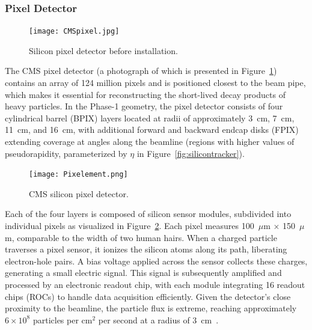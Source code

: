 \subsubsection{Pixel Detector}

\begin{figure}[!ht]
    \begin{center}
        \texttt{[image: CMSpixel.jpg]}
        \caption{Silicon pixel detector before installation.}
        \label{fig:CMSpixel}
    \end{center}
\end{figure}

The CMS pixel detector (a photograph of which is presented in Figure~\ref{fig:CMSpixel}) contains an array of 124 million pixels and is positioned closest to the beam pipe, which makes it essential for reconstructing the short-lived decay products of heavy particles. In the Phase-1 geometry, the pixel detector consists of four cylindrical barrel (BPIX) layers located at radii of approximately 3~cm, 7~cm, 11~cm, and 16~cm, with additional forward and backward endcap disks (FPIX) extending coverage at angles along the beamline (regions with higher values of pseudorapidity, parameterized by $\eta$ in Figure~\ref{fig:silicontracker}).

\begin{figure}[!ht]
    \begin{center}
        \texttt{[image: Pixelement.png]}
        \caption{CMS silicon pixel detector.}
        \label{fig:Pixelement}
    \end{center}
\end{figure}

Each of the four layers is composed of silicon sensor modules, subdivided into individual pixels as visualized in Figure~\ref{fig:Pixelement}. Each pixel measures 100~$\mu$m $\times$ 150~$\mu$m, comparable to the width of two human hairs. When a charged particle traverses a pixel sensor, it ionizes the silicon atoms along its path, liberating electron-hole pairs. A bias voltage applied across the sensor collects these charges, generating a small electric signal. This signal is subsequently amplified and processed by an electronic readout chip, with each module integrating 16 readout chips (ROCs) to handle data acquisition efficiently. Given the detector’s close proximity to the beamline, the particle flux is extreme, reaching approximately $6 \times 10^8$ particles per cm$^2$ per second at a radius of 3~cm~\cite{The_CMS_Collaboration_2008}.


